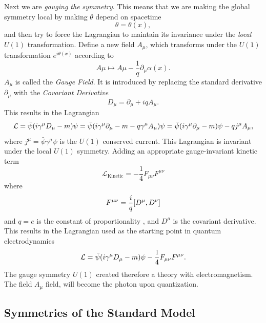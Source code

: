 Next we are \emph{gauging the symmetry}. This means that we are making the global symmetry local by making $\theta$ depend on spacetime
\begin{equation}
\theta=\theta(x),
\end{equation}
and then try to force the Lagrangian to maintain its invariance under the \emph{local} $U(1)$ transformation. Define a new field $A_{\mu}$, which transforms under the $U(1)$ transformation $e^{i\theta(x)}$ according to
\begin{equation}
A\mu\mapsto A\mu-\frac{1}{q}\partial_{\mu}\alpha(x).
\end{equation}
$A_{\mu}$ is called the \emph{Gauge Field}. It is introduced by replacing the standard derivative $\partial_{\mu}$ with the \emph{Covariant Derivative}
\begin{equation}
D_{\mu}=\partial_{\mu}+iqA_{\mu}.
\end{equation}
This results in the Lagrangian
\begin{equation}
\mathcal{L}=\bar{\psi}\qty(i\gamma^{\mu}D_{\mu}-m)\psi=\bar{\psi}\qty(i\gamma^{\mu}\partial_{\mu}-m-q\gamma^{\mu}A_{\mu})\psi=\bar{\psi}\qty(i\gamma^{\mu}\partial_{\mu}-m)\psi-qj^{\mu}A_{\mu},
\end{equation}
where $j^{\mu}=\bar{\psi}\gamma^{\mu}\psi$ is the $U(1)$ conserved current. This Lagrangian is invariant under the local $U(1)$ symmetry. Adding an appropriate gauge-invariant kinetic term 
\begin{equation}
\mathcal{L}_{\textrm{Kinetic}}=-\frac{1}{4}F_{\mu\nu}F^{\mu\nu}
\end{equation}
where
\begin{equation}
F^{\mu\nu}=\frac{i}{q}\comm{D^\mu}{D^\nu}
\end{equation}
and $q=e$ is the constant of proportionality , and $D^\mu$ is the covariant derivative. This results in the Lagrangian used as the starting point in quantum electrodynamics
\begin{equation}
\mathcal{L}=\bar{\psi}\qty(i\gamma^{\mu}D_{\mu}-m)\psi-\frac{1}{4}F_{\mu\nu}F^{\mu\nu}.
\end{equation}
The gauge symmetry $U(1)$ created therefore a theory with electromagnetism. The field $A_{\mu}$ field, will become the photon upon quantization.

\subsection{Symmetries of the Standard Model}
\label{symmetries-of-the-standard-model}

